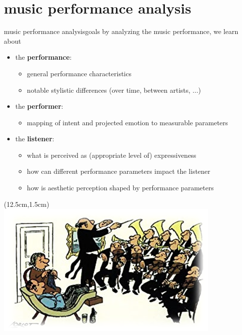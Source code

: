     \section[performance analysis]{music performance analysis}
        \begin{frame}{music performance analysis}{goals}
            by analyzing the music performance, we learn about
            \bigskip

            \begin{itemize}
                \item	the \textbf{performance}: 
                    \begin{itemize}
                        \item   general performance characteristics
                        \item   notable stylistic differences (over time, between artists, ...)
                    \end{itemize}
                \item	the \textbf{performer}: 
                    \begin{itemize}
                        \item   mapping of intent and projected emotion to measurable parameters
                    \end{itemize}
                \item	the \textbf{listener}: 
                    \begin{itemize}
                        \item   what is perceived as (appropriate level of) expressiveness
                        \item   how can different performance parameters impact the listener
                        \item   how is aesthetic perception shaped by performance parameters
                    \end{itemize}
            \end{itemize}

            \begin{textblock*}{100mm}(12.5cm,1.5cm)
                \includegraphics[scale=.5,keepaspectratio]{graph/life_concert}
            \end{textblock*}
 
        \end{frame}
            
